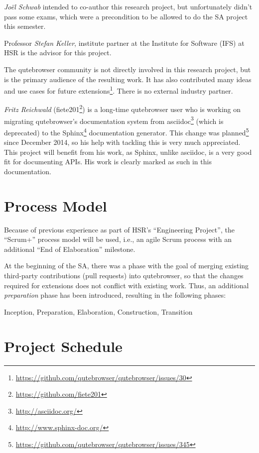 \documentclass[a4paper,parskip=full]{scrreprt}
\begin{document}
\emph{Joël Schwab} intended to co-author this research project, but
unfortunately didn't pass some exams, which were a precondition to be allowed to
do the SA project this semester.

Professor \emph{Stefan Keller}, institute partner at the Institute for Software
(IFS) at HSR is the advisor for this project.

The qutebrowser community is not directly involved in this research project, but
is the primary audience of the resulting work. It has also contributed many
ideas and use cases for future
extensions\footnote{\url{https://github.com/qutebrowser/qutebrowser/issues/30}}.
There is no external industry partner.

\label{fiete}
\emph{Fritz Reichwald} (fiete201\footnote{\url{https://github.com/fiete201}})
is a long-time qutebrowser user who is working on migrating qutebrowser's
documentation system from asciidoc\footnote{\url{http://asciidoc.org/}} (which
is deprecated) to the Sphinx\footnote{\url{http://www.sphinx-doc.org/}}
documentation generator. This change was
planned\footnote{\url{https://github.com/qutebrowser/qutebrowser/issues/345}}
since December 2014, so his help with tackling this is very much appreciated.
This project will benefit from his work, as Sphinx, unlike asciidoc, is a
very good fit for documenting APIs. His work is clearly marked as such in this
documentation.

\section{Process Model}
Because of previous experience as part of HSR's ``Engineering Project'', the
``Scrum+'' process model will be used, i.e., an agile Scrum process with an
additional ``End of Elaboration'' milestone.

At the beginning of the SA, there was a phase with the goal of merging existing
third-party contributions (pull requests) into qutebrowser, so that the changes
required for extensions does not conflict with existing work. Thus, an additional
\emph{preparation} phase has been introduced, resulting in the following phases:

Inception, Preparation, Elaboration, Construction, Transition

\section{Project Schedule}
\label{schedule}
\end{document}
